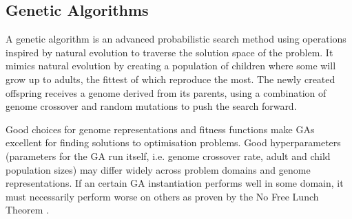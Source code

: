 \subsection{Genetic Algorithms}
\label{section:background:ga}

A genetic algorithm is an advanced probabilistic search method using operations inspired by natural evolution to traverse the solution space of the problem.
It mimics natural evolution by creating a population of children where some will grow up to adults,
the fittest of which reproduce the most.
The newly created offspring receives a genome derived from its parents,
using a combination of genome crossover and random mutations to push the search forward.

Good choices for genome representations and fitness functions make GAs excellent for finding solutions to optimisation problems.
Good hyperparameters (parameters for the GA run itself, i.e. genome crossover rate, adult and child population sizes) may differ widely across problem domains and genome representations.
If an certain GA instantiation performs well in some domain,
it must necessarily perform worse on others as proven by the No Free Lunch Theorem \cite{wolpert1997no}.
